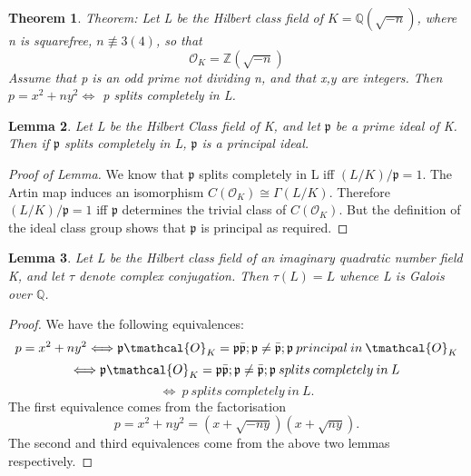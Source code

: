 \documentclass[preprint,12pt,reqno]{elsarticle}
\newtheorem{theorem}{Theorem}
\newtheorem{lemma}[theorem]{Lemma}
\begin{document}
\begin{theorem}
Theorem: Let L be the Hilbert class field of $K=\mathbb{Q}(\sqrt{-n})$, where n is squarefree, $n\not\equiv 3(4)$, so that
\begin{equation}
    \mathcal{O}_K=\mathbb{Z}(\sqrt{-n})
\end{equation}
Assume that p is an odd prime not dividing n, and that x,y are integers. Then
$p=x^2+ny^2 \Longleftrightarrow$ p splits completely in L.
\end{theorem}
\begin{lemma}
Let L be the Hilbert Class field of K, and let $\mathfrak{p}$ be a prime ideal of K. Then if $\mathfrak{p}$ splits completely in L, $\mathfrak{p}$ is a principal ideal.
\end{lemma}
\begin{proof}[Proof of Lemma]
We know that $\mathfrak{p}$ splits completely in L iff $(L/K)/\mathfrak{p}=1$. The Artin map induces an isomorphism $C(\mathcal{O}_K)\cong\Gamma(L/K)$. Therefore $(L/K)/\mathfrak{p}=1$ iff $\mathfrak{p}$ determines the trivial class of $C(\mathcal{O}_K)$. But the definition of the ideal class group shows that $\mathfrak{p}$ is principal as required.
\end{proof}
\begin{lemma}
Let L be the Hilbert class field of an imaginary quadratic number field K, and let $\tau$ denote complex conjugation. Then $\tau(L)=L$ whence L is Galois over $\mathbb{Q}$.
\end{lemma}
\begin{proof}
We have the following equivalences:
\begin{equation}
    p=x^2+ny^2\Longleftrightarrow\mathfrak{p}\tmathcal{O}_K=\mathfrak{p}\bar{\mathfrak{p}}; \mathfrak{p}\neq\bar{\mathfrak{p}}; \mathfrak{p}\: principal\:in\: \tmathcal{O}_K
\end{equation}
\begin{equation}
    \Longleftrightarrow\mathfrak{p}\tmathcal{O}_K=\mathfrak{p}\bar{\mathfrak{p}}; \mathfrak{p}\neq\bar{\mathfrak{p}}; \mathfrak{p}\:splits\:completely\:in\:L
\end{equation}
\begin{equation}
    \Longleftrightarrow\:p\:splits\:completely\:in\:L.
\end{equation}
The first equivalence comes from the factorisation 
\begin{equation}
    p=x^2+ny^2=(x+\sqrt{-ny})(x+\sqrt{ny}).
\end{equation}
The second and third equivalences come from the above two lemmas respectively.
\end{proof}
\end{document}
